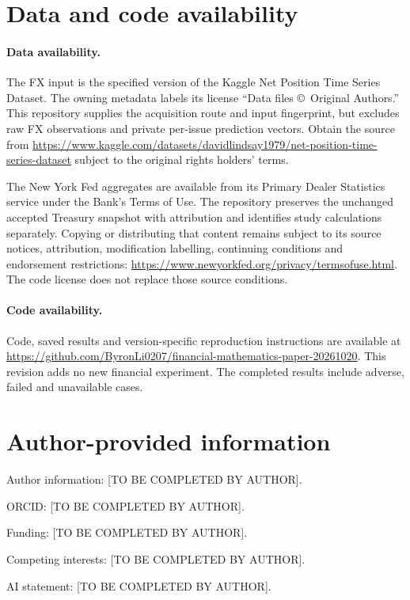 \section*{Data and code availability}
\paragraph{Data availability.} The FX input is the specified version of the Kaggle Net Position Time Series Dataset. The owning metadata labels its license ``Data files \copyright\ Original Authors.'' This repository supplies the acquisition route and input fingerprint, but excludes raw FX observations and private per-issue prediction vectors. Obtain the source from \url{https://www.kaggle.com/datasets/davidlindsay1979/net-position-time-series-dataset} subject to the original rights holders' terms.

The New York Fed aggregates are available from its Primary Dealer Statistics service under the Bank's Terms of Use. The repository preserves the unchanged accepted Treasury snapshot with attribution and identifies study calculations separately. Copying or distributing that content remains subject to its source notices, attribution, modification labelling, continuing conditions and endorsement restrictions: \url{https://www.newyorkfed.org/privacy/termsofuse.html}. The code license does not replace those source conditions.

\paragraph{Code availability.} Code, saved results and version-specific reproduction instructions are available at \url{https://github.com/ByronLi0207/financial-mathematics-paper-20261020}. This revision adds no new financial experiment. The completed results include adverse, failed and unavailable cases.

\section*{Author-provided information}
Author information: [TO BE COMPLETED BY AUTHOR].\par
ORCID: [TO BE COMPLETED BY AUTHOR].\par
Funding: [TO BE COMPLETED BY AUTHOR].\par
Competing interests: [TO BE COMPLETED BY AUTHOR].\par
AI statement: [TO BE COMPLETED BY AUTHOR].
